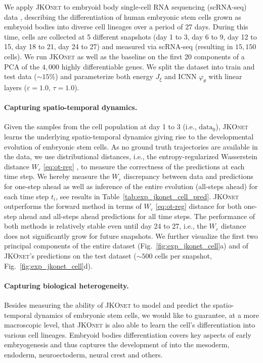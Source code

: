We apply \textsc{JKOnet} to embryoid body single-cell RNA sequencing (scRNA-seq) data \citep{moon2019visualizing}, describing the differentiation of human embryonic stem cells grown as embryoid bodies into diverse cell lineages over a period of 27 days. During this time, cells are collected at 5 different snapshots (day 1 to 3, day 6 to 9, day 12 to 15, day 18 to 21, day 24 to 27) and measured via scRNA-seq (resulting in $15,150$ cells).
We run \textsc{JKOnet} as well as the baseline on the first 20 components of a \acrfull{PCA} of the $4,000$ highly differentiable genes.
We split the dataset into train and test data ($\sim 15 \%$) and parameterize both energy $J_\xi$ and ICNN $\varphi_\theta$ with linear layers ($\varepsilon = 1.0$, $\tau = 1.0$).

\paragraph{Capturing spatio-temporal dynamics.}
Given the samples from the cell population at day 1 to 3 (i.e., $\mathrm{data}_0$), \textsc{JKOnet} learns the underlying spatio-temporal dynamics giving rise to the developmental evolution of embryonic stem cells. 
As no ground truth trajectories are available in the data, we use distributional distances, i.e., the entropy-regularized Wasserstein distance $W_\varepsilon$ \eqref{eq:ot-reg} \citep{flamary2021pot}, to measure the correctness of the predictions at each time step.
We hereby measure the $W_\varepsilon$ discrepancy between data and predictions for one-step ahead as well as inference of the entire evolution (all-steps ahead) for each time step $t_i$, see results in Table~\ref{tab:exp_jkonet_cell_pred}. \textsc{JKOnet} outperforms the forward method in terms of $W_\varepsilon$ \eqref{eq:ot-reg} distance for both one-step ahead and all-steps ahead predictions for all time steps. 
The performance of both methods is relatively stable even until day 24 to 27, i.e., the $W_\varepsilon$ distance does not significantly grow for future snapshots.
We further visualize the first two principal components of the entire dataset (Fig.~\ref{fig:exp_jkonet_cell}a) and of \textsc{JKOnet}'s predictions on the test dataset ($\sim 500$ cells per snapshot, Fig.~\ref{fig:exp_jkonet_cell}d). 

\paragraph{Capturing biological heterogeneity.}
Besides measuring the ability of \textsc{JKOnet} to model and predict the spatio-temporal dynamics of embryonic stem cells, we would like to guarantee, at a more macroscopic level, that \textsc{JKOnet} is also able to learn the cell's differentiation into various cell lineages.
Embryoid bodies differentiation covers key aspects of early embryogenesis and thus captures the development of  into the mesoderm, endoderm, neuroectoderm, neural crest and others.

